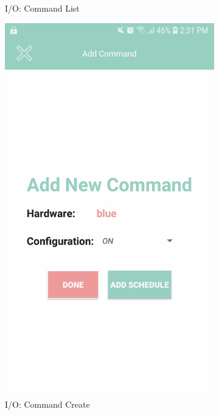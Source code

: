 \documentclass[12pt]{paper}
\begin{document}
\begin{figure}[H]
\begin{subfigure}[b]{.35\linewidth}
				\caption{I/O: Command List}
			\end{subfigure}
			\begin{subfigure}[b]{.35\linewidth}
				\includegraphics[width=\linewidth]{img/output_command_new.jpg}
				\caption{I/O: Command Create}
			\end{subfigure}
			\begin{subfigure}[b]{.35\linewidth}

\end{subfigure}
\end{figure}
\end{document}
